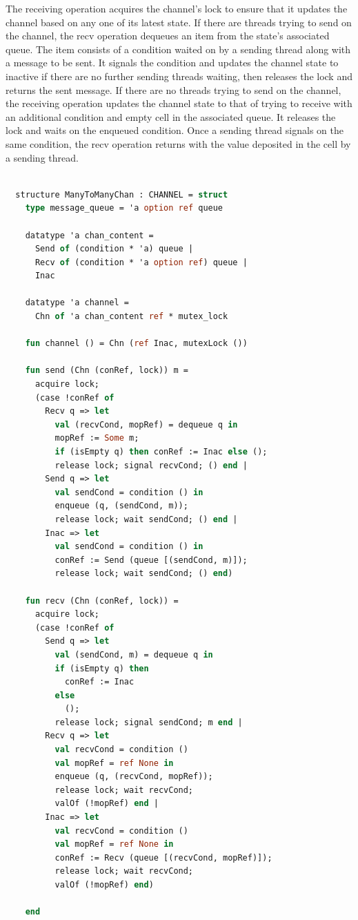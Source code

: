 \documentclass{article}
\begin{document}
The receiving operation acquires the channel's lock to ensure that it updates the channel based on
any one of its latest state.  If there are threads trying to send on the channel, the recv
operation dequeues an item from the state's associated queue.  The item consists of a condition
waited on by a sending thread along with a message to be sent.  It signals the condition and
updates the channel state to inactive if there are no further sending threads waiting, then
releases the lock and returns the sent message.  If there are no threads trying to send on the
channel, the receiving operation updates the channel state to that of trying to receive with an
additional condition and empty cell in the associated queue.  It releases the lock and waits on
the enqueued condition.  Once a sending thread signals on the same condition, the recv
operation returns with the value deposited in the cell by a sending thread.

\begin{lstlisting}[language=ML, escapechar=\%]

  structure ManyToManyChan : CHANNEL = struct
    type message_queue = 'a option ref queue

    datatype 'a chan_content = 
      Send of (condition * 'a) queue | 
      Recv of (condition * 'a option ref) queue | 
      Inac

    datatype 'a channel =
      Chn of 'a chan_content ref * mutex_lock 

    fun channel () = Chn (ref Inac, mutexLock ())

    fun send (Chn (conRef, lock)) m = 
      acquire lock;
      (case !conRef of
        Recv q => let
          val (recvCond, mopRef) = dequeue q in
          mopRef := Some m;
          if (isEmpty q) then conRef := Inac else (); 
          release lock; signal recvCond; () end |
        Send q => let
          val sendCond = condition () in
          enqueue (q, (sendCond, m));
          release lock; wait sendCond; () end |
        Inac => let
          val sendCond = condition () in
          conRef := Send (queue [(sendCond, m)]);
          release lock; wait sendCond; () end)

    fun recv (Chn (conRef, lock)) =  
      acquire lock;
      (case !conRef of 
        Send q => let
          val (sendCond, m) = dequeue q in
          if (isEmpty q) then
            conRef := Inac
          else
            (); 
          release lock; signal sendCond; m end |
        Recv q => let
          val recvCond = condition ()
          val mopRef = ref None in
          enqueue (q, (recvCond, mopRef));
          release lock; wait recvCond;
          valOf (!mopRef) end |
        Inac => let
          val recvCond = condition ()
          val mopRef = ref None in
          conRef := Recv (queue [(recvCond, mopRef)]);
          release lock; wait recvCond;
          valOf (!mopRef) end)

    end

  \end{lstlisting}
\end{document}
